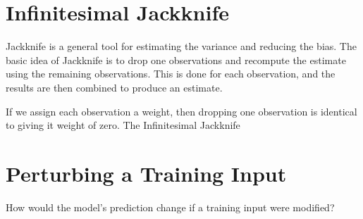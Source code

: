 \section{Infinitesimal Jackknife}
Jackknife is a general tool for estimating the variance and reducing the bias.
The basic idea of Jackknife is to drop one observations and recompute the estimate using the remaining observations.
This is done for each observation, and the results are then combined to produce an estimate.


If we assign each observation a weight, then dropping one observation is identical to giving it weight of zero.
The Infinitesimal Jackknife




\section{Perturbing a Training Input}
How would the model's prediction change if a training input were modified?


